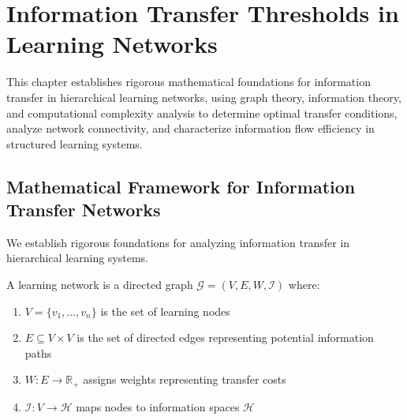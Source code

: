 \chapter{Information Transfer Thresholds in Learning Networks}

\begin{tcolorbox}[colback=DarkSkyBlue!5!white,colframe=DarkSkyBlue!75!black,title=Chapter Summary]
This chapter establishes rigorous mathematical foundations for information transfer in hierarchical learning networks, using graph theory, information theory, and computational complexity analysis to determine optimal transfer conditions, analyze network connectivity, and characterize information flow efficiency in structured learning systems.
\end{tcolorbox}

\section{Mathematical Framework for Information Transfer Networks}

We establish rigorous foundations for analyzing information transfer in hierarchical learning systems.

\begin{definition}
\label{def:learning_network}
A learning network is a directed graph $\mathcal{G} = (V, E, W, \mathcal{I})$ where:
\begin{enumerate}
\item $V = \{v_1, \ldots, v_n\}$ is the set of learning nodes
\item $E \subseteq V \times V$ is the set of directed edges representing potential information paths
\item $W: E \to \mathbb{R}_+$ assigns weights representing transfer costs
\item $\mathcal{I}: V \to \mathcal{H}$ maps nodes to information spaces $\mathcal{H}$
\end{enumerate}
\end{definition}

